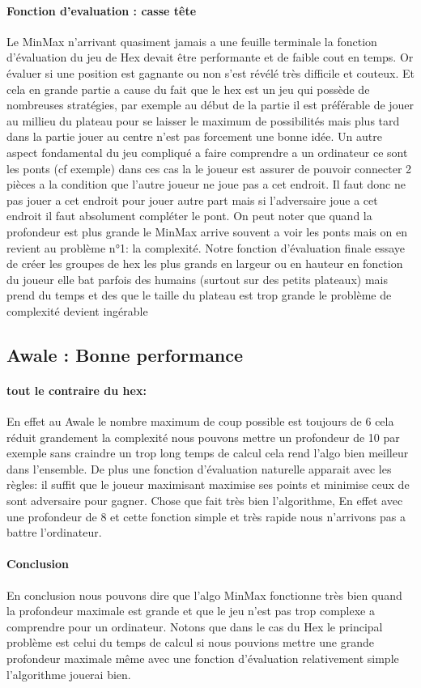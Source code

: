 \paragraph{Fonction d'evaluation : casse tête}Le MinMax n'arrivant quasiment jamais a une feuille terminale la fonction
d'évaluation du jeu de Hex devait être performante et de faible cout en temps. Or évaluer si une position est gagnante 
ou non s'est révélé très difficile et couteux. Et cela en grande partie a cause du fait que le hex est un jeu qui 
possède de nombreuses stratégies, par exemple au début de la partie il est préférable de jouer au millieu du plateau 
pour se laisser le maximum de possibilités mais plus tard dans la partie jouer au centre n'est pas forcement 
une bonne idée. Un autre aspect fondamental du jeu compliqué a faire comprendre a un ordinateur ce sont les ponts 
(cf exemple) dans ces cas la le joueur est assurer de pouvoir connecter 2 pièces a la condition que l'autre joueur ne 
joue pas a cet endroit. Il faut donc ne pas jouer a cet endroit pour jouer autre part mais si l'adversaire joue a cet 
endroit il faut absolument compléter le pont. On peut noter que quand la profondeur est plus grande le MinMax arrive 
souvent a voir les ponts mais on en revient au problème n°1: la complexité.
Notre fonction d'évaluation finale essaye de créer les groupes de hex les plus grands en largeur ou en hauteur en 
fonction du joueur elle bat parfois des humains (surtout sur des petits plateaux) mais prend du temps et des que le 
taille du plateau est trop grande le problème de complexité devient ingérable


\subsection {Awale : Bonne performance}
\paragraph {tout le contraire du hex:}En effet au Awale le nombre maximum de coup possible est toujours de 6 cela 
réduit grandement la complexité nous pouvons mettre un profondeur de 10 par exemple sans craindre un trop long temps 
de calcul cela rend l'algo bien meilleur dans l'ensemble.
De plus une fonction d'évaluation naturelle apparait avec les règles: il suffit que le joueur maximisant maximise 
ses points et minimise ceux de sont adversaire pour gagner. Chose que fait très bien l'algorithme, En effet avec 
une profondeur de 8 et cette fonction simple et très rapide nous n'arrivons pas a battre l'ordinateur.

\paragraph {Conclusion}En conclusion nous pouvons dire que l'algo MinMax fonctionne très bien quand la profondeur 
maximale est grande et que le jeu n'est pas trop complexe a comprendre pour un ordinateur. 
Notons que dans le cas du Hex le principal problème est celui du temps de calcul si nous pouvions mettre une grande 
profondeur maximale même avec une fonction d'évaluation relativement simple l'algorithme jouerai bien.